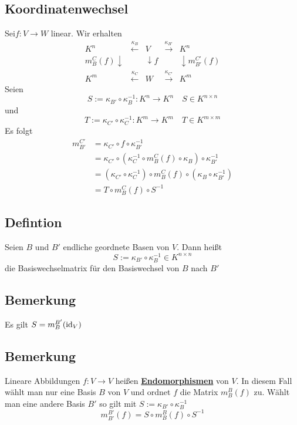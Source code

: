 \subsection{Koordinatenwechsel} %
\label{sub:koordinatenwechsel}
Sei$f : V \to W$ linear. Wir erhalten
\[
	\begin{array}{rcccl}
		K^n & \xleftarrow{\kappa_B} & V & \xrightarrow{\kappa_{B'}} & K^n \\
		m_B^C(f) \downarrow & & \downarrow f & & \downarrow m_{B'}^{C'}(f) \\
		K^m & \xleftarrow{\kappa_C} & W & \xrightarrow{\kappa_{C'}} & K^m 
	\end{array}
\]
Seien
\[
	S := \kappa_{B'} \circ \kappa_B ^{-1} : K^n \to K^n \quad S \in K^{n \times n}
\]
und
\[
	T := \kappa_{C'} \circ \kappa_C ^{-1} : K^m \to K^m \quad T \in K^{m \times m}
\]
Es folgt
\begin{align*}
	m_{B'}^{C'} &= \kappa_{C'} \circ f \circ \kappa_{B'} ^{-1} \\
	&= \kappa_{C'} \circ ( \kappa_{C} ^{-1} \circ m_B^C (f) \circ \kappa_B ) \circ \kappa_{B'} ^{-1} \\
	&= (\kappa_{C'} \circ  \kappa_{C}^{-1}) \circ m_B^C (f) \circ ( \kappa_B \circ \kappa_{B'} ^{-1})\\
	&= T \circ m_B^C (f) \circ S ^{-1}
\end{align*}

\subsection{Defintion} %
\label{sub:defintion}
Seien $B$ und $B'$ endliche geordnete Basen von $V$. Dann heißt 
\[
	S:= \kappa_{B'} \circ \kappa_B^{-1} \in K^{n \times n}
\]
die Basiswechselmatrix für den Basiswechsel von $B$ nach $B'$

\subsection{Bemerkung} %
\label{sub:bemerkung}
Es gilt $S= m_B^{B'} (\operatorname{id}_V)$

\subsection{Bemerkung} %
\label{sub:bemerkung}
Lineare Abbildungen $f: V \to V$ heißen \underline{\textbf{Endomorphismen}} von $V$. In diesem Fall wählt man nur eine Basis $B$ von $V$ und 
ordnet $f$ die Matrix $m_{B}^{B}(f)$ zu. Wählt man eine andere Basis $B'$ so gilt mit $S:= \kappa_{B'} \circ \kappa_{B}^{-1}$
\[
	m_{B'}^{B'}(f)= S \circ m_B^B(f) \circ S^{-1}
\]


